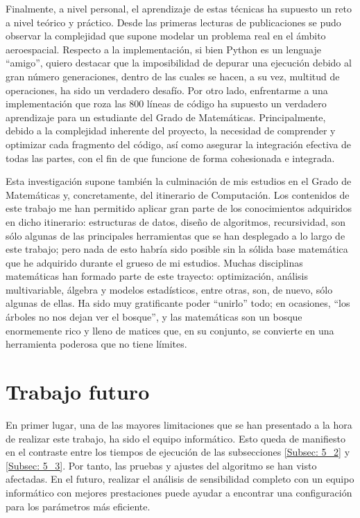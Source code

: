 \documentclass[12pt,a4paper]{book}
\begin{document}
Finalmente, a nivel personal, el aprendizaje de estas técnicas ha supuesto un reto a nivel teórico y práctico. Desde las primeras lecturas de publicaciones se pudo observar la complejidad que supone modelar un problema real en el ámbito aeroespacial. Respecto a la implementación, si bien Python es un lenguaje ``amigo'', quiero destacar que la imposibilidad de depurar una ejecución debido al gran número generaciones, dentro de las cuales se hacen, a su vez, multitud de operaciones, ha sido un verdadero desafío. Por otro lado, enfrentarme a una implementación que roza las 800 líneas de código ha supuesto un verdadero aprendizaje para un estudiante del Grado de Matemáticas. Principalmente, debido a la complejidad inherente del proyecto, la necesidad de comprender y optimizar cada fragmento del código, así como asegurar la integración efectiva de todas las partes, con el fin de que funcione de forma cohesionada e integrada. 

Esta investigación supone también la culminación de mis estudios en el Grado de Matemáticas y, concretamente, del itinerario de Computación. Los contenidos de este trabajo me han permitido aplicar gran parte de los conocimientos adquiridos en dicho itinerario: estructuras de datos, diseño de algoritmos, recursividad, son sólo algunas de las principales herramientas que se han desplegado a lo largo de este trabajo; pero nada de esto habría sido posible sin la sólida base matemática que he adquirido durante el grueso de mi estudios. Muchas disciplinas matemáticas han formado parte de este trayecto: optimización, análisis multivariable, álgebra y modelos estadísticos, entre otras, son, de nuevo, sólo algunas de ellas. Ha sido muy gratificante poder ``unirlo'' todo; en ocasiones, ``los árboles no nos dejan ver el bosque'', y las matemáticas son un bosque enormemente rico y lleno de matices que, en su conjunto, se convierte en una herramienta poderosa que no tiene límites.

\section{Trabajo futuro} \label{Subsec: 6_2}
En primer lugar, una de las mayores limitaciones que se han presentado a la hora de realizar este trabajo, ha sido el equipo informático. Esto queda de manifiesto en el contraste entre los tiempos de ejecución de las subsecciones \ref{Subsec: 5_2} y \ref{Subsec: 5_3}. Por tanto, las pruebas y ajustes del algoritmo se han visto afectadas. En el futuro, realizar el análisis de sensibilidad completo con un equipo informático con mejores prestaciones puede ayudar a encontrar una configuración para los parámetros más eficiente.  
\end{document}

